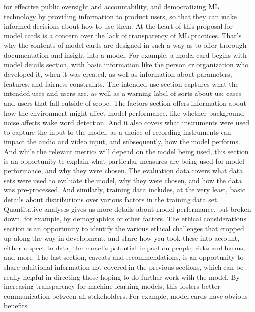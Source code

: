 {{{{{{{{    for effective public oversight and accountability,
    and democratizing ML technology by providing information to product users,
    so that they can make informed decisions about how to use them.
    At the heart of this proposal for model cards
    is a concern over the lack of transparency of ML practices.
    That's why the contents of model cards are designed in such a way as
    to offer thorough documentation and insight into a model.
    For example, a model card begins with model details
    section, with basic information like the person or organization who
    developed it, when it was created, as well as
    information about parameters, features, and fairness constraints.
    The intended use section captures what the intended uses and users are,
    as well as a warning label of sorts about use cases and users
    that fall outside of scope.
    The factors section offers information about how the environment might
    affect model performance, like whether background noise affects wake word
    detection.
    And it also covers what instruments were used to capture the input to the model,
    as a choice of recording instruments can impact the audio and video input,
    and subsequently, how the model performs.
    And while the relevant metrics will depend on the model being used,
    this section is an opportunity to explain
    what particular measures are being used for model performance,
    and why they were chosen.
    The evaluation data covers what data sets were used to evaluate the model,
    why they were chosen, and how the data was pre-processed.
    And similarly, training data includes, at the very least, basic details
    about distributions over various factors in the training data set.
    Quantitative analyses gives us more details about model performance,
    but broken down, for example, by demographics or other factors.
    The ethical considerations section is an opportunity
    to identify the various ethical challenges that cropped up
    along the way in development, and share how you took these into account,
    either respect to data, the model's potential impact on people, risks
    and harms, and more.
    The last section, caveats and recommendations,
    is an opportunity to share additional information not covered
    in the previous sections, which can be really
    helpful in directing those hoping to do further work with the model.
    By increasing transparency for machine learning models,
    this fosters better communication between all stakeholders.
    For example, model cards have obvious benefits
}}}}}}}}
